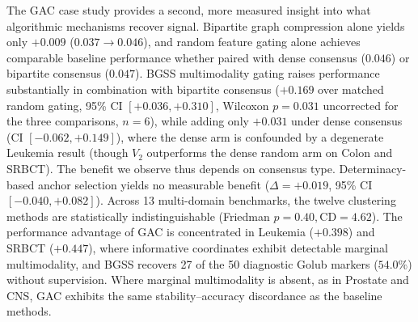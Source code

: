 \documentclass[pdflatex,sn-mathphys-num]{sn-jnl}
\theoremstyle{thmstyleone}
\theoremstyle{thmstyletwo}
\theoremstyle{thmstylethree}
\begin{document}
The GAC case study provides a second, more measured insight into what algorithmic mechanisms recover signal. Bipartite graph compression alone yields only $+0.009$ ($0.037 \to 0.046$), and random feature gating alone achieves comparable baseline performance whether paired with dense consensus ($0.046$) or bipartite consensus ($0.047$). BGSS multimodality gating raises performance substantially in combination with bipartite consensus ($+0.169$ over matched random gating, 95\% CI $[+0.036, +0.310]$, Wilcoxon $p = 0.031$ uncorrected for the three comparisons, $n = 6$), while adding only $+0.031$ under dense consensus (CI $[-0.062, +0.149]$), where the dense arm is confounded by a degenerate Leukemia result (though $V_2$ outperforms the dense random arm on Colon and SRBCT). The benefit we observe thus depends on consensus type. Determinacy-based anchor selection yields no measurable benefit ($\Delta = +0.019$, 95\% CI $[-0.040, +0.082]$). Across 13 multi-domain benchmarks, the twelve clustering methods are statistically indistinguishable (Friedman $p = 0.40, \text{CD} = 4.62$). The performance advantage of GAC is concentrated in Leukemia ($+0.398$) and SRBCT ($+0.447$), where informative coordinates exhibit detectable marginal multimodality, and BGSS recovers 27 of the 50 diagnostic Golub markers ($54.0\%$) without supervision. Where marginal multimodality is absent, as in Prostate and CNS, GAC exhibits the same stability--accuracy discordance as the baseline methods.
\end{document}
